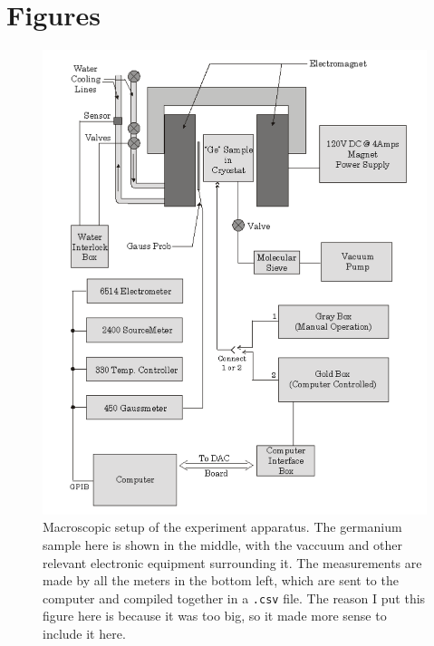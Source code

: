 \documentclass[10pt]{article}
\begin{document}
	\nocite{*}
	\printbibliography


	\newpage
	\appendix
	\section{Figures}
	\begin{figure}[h]
		\centering
		\includegraphics[scale=0.5]{images/setup-3.png}
		\caption{Macroscopic setup of the experiment apparatus. The germanium sample here is shown in the
			middle, with the vaccuum and other relevant electronic equipment surrounding it. The measurements are
			made by all the meters in the bottom left, which  are sent to the computer and compiled together in a
			\texttt{.csv} file. The reason I put this figure here is because it was too big, so it made more
		sense to include it here.}
		\label{setup-3}
	\end{figure}

	\pagebreak
\end{document}
